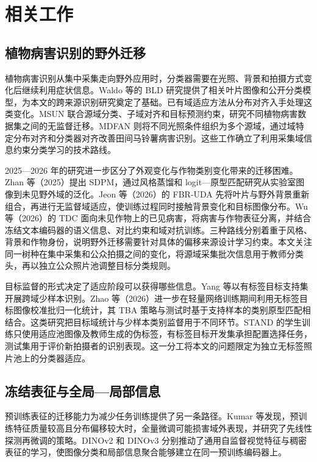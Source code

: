 \documentclass[11pt,a4paper,UTF8,fontset=windows,scheme=plain]{ctexart}
\begin{document}
\section{相关工作}
\label{sec:related}
\subsection{植物病害识别的野外迁移}
植物病害识别从集中采集走向野外应用时，分类器需要在光照、背景和拍摄方式变化后继续利用症状信息。Waldo 等的 BLD 研究提供了相关叶片图像和公开分类模型\cite{waldo2026}，为本文的跨来源识别研究奠定了基础。已有域适应方法从分布对齐入手处理这类变化。MSUN 联合源域分类、子域对齐和目标预测约束，研究不同植物病害数据集之间的无监督迁移\cite{wu2023}。MDFAN 则将不同光照条件组织为多个源域，通过域特定分布对齐和分类器对齐改善田间马铃薯病害识别\cite{gao2024}。这些工作确立了利用采集域信息约束分类学习的技术路线。

2025—2026 年的研究进一步区分了外观变化与作物类别变化带来的迁移困难。Zhan 等（2025）提出 SDPM，通过风格蒸馏和 logit—原型匹配研究从实验室图像到未见野外域的泛化\cite{zhan2025}。Jeon 等（2026）的 FBR-UDA 先将叶片与野外背景重新组合，再进行无监督域适应，使训练过程同时接触背景变化和目标图像分布\cite{jeon2026}。Wu 等（2026）的 TDC 面向未见作物上的已见病害，将病害与作物表征分离，并结合冻结文本编码器的语义信息、对比约束和域对抗训练\cite{wu2026}。三种路线分别着重于风格、背景和作物身份，说明野外迁移需要针对具体的偏移来源设计学习约束。本文关注同一树种在集中采集和公众拍摄之间的变化，将源域采集批次信息用于教师分类头，再以独立公众照片池调整目标分类规则。

目标监督的形式决定了适应阶段可以获得哪些信息。Yang 等以有标签目标支持集开展跨域少样本识别\cite{yang2024}。Zhao 等（2026）进一步在轻量网络训练期间利用无标签目标图像校准批归一化统计，其 TBA 策略与测试时基于支持样本的类别原型匹配相结合\cite{zhao2026}。这类研究把目标域统计与少样本类别监督用于不同环节。STAND 的学生训练只使用适应池图像及教师生成的伪标签，有标签目标开发集承担配置选择任务，测试集用于评价新拍摄者的识别表现。这一分工将本文的问题限定为独立无标签照片池上的分类器适应。

\subsection{冻结表征与全局—局部信息}
预训练表征的迁移能力为减少任务训练提供了另一条路径。Kumar 等发现，预训练特征质量较高且分布偏移较大时，全量微调可能损害域外表现，并研究了先线性探测再微调的策略\cite{kumar2022}。DINOv2 和 DINOv3 分别推动了通用自监督视觉特征与稠密表征的学习\cite{oquab2024,simeoni2026}，使图像分类和局部信息聚合能够建立在同一预训练编码器上。
\end{document}
